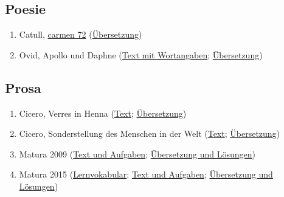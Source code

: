 \documentclass{scrartcl}
\begin{document}
\subsection{Poesie}
\label{sec:org8b35457}
\begin{enumerate}
\item Catull, \href{https://www.dropbox.com/s/kc2coqw11nfxyj1/Catull72.pdf?dl=0}{carmen 72} (\href{http://www.gottwein.de/Lat/catull/catull072.php}{Übersetzung})
\item Ovid, Apollo und Daphne (\href{https://www.dropbox.com/s/g60dha8uuh5h0po/OVIDApolloDaphne.pdf?dl=0}{Text mit Wortangaben}; \href{https://www.dropbox.com/s/366v4v48njyzebm/\%25C3\%259CApollDaphne.pdf?dl=0}{Übersetzung})
\end{enumerate}

\subsection{Prosa}
\label{sec:org68e94b7}
\begin{enumerate}
\item Cicero, Verres in Henna (\href{https://www.dropbox.com/s/gqrgxo7yjxglmdv/Matura\_LatInt\_schriftlich\_2016.pdf?dl=0}{Text}; \href{https://www.dropbox.com/s/h6y42hky2w0o2x9/\%25C3\%259Cbersetzung.pdf?dl=0}{Übersetzung})
\item Cicero, Sonderstellung des Menschen in der Welt (\href{https://www.dropbox.com/s/22oxzqeor9vqb67/LatIntSchriftlMatura2009.pdf?dl=0}{Text}; \href{https://www.dropbox.com/s/ieihesw9h0rkejd/\%25C3\%259CbersetzungMaturaLatIntensiv2009.pdf?dl=0}{Übersetzung})
\item Matura 2009 (\href{https://www.dropbox.com/s/fnt9bzwl6hklwv6/SPFSchriftlich2009.pdf?dl=0}{Text und Aufgaben}; \href{https://www.dropbox.com/s/hh89pcj1sy28kby/KorrekturSchriftlMaturaSPF2009.pdf?dl=0}{Übersetzung und Lösungen})
\item Matura 2015 (\href{https://www.dropbox.com/s/hl878959yooat32/Voki.pdf?dl=0}{Lernvokabular}; \href{https://www.dropbox.com/s/8qaeceb1qyemfwz/KSS\_Matura2015\_final.pdf?dl=0}{Text und Aufgaben}; \href{https://www.dropbox.com/s/xwvzrif0nu15j8h/Korrketur\_SPF\_Latein\_2015.pdf?dl=0}{Übersetzung und
Lösungen})
\end{enumerate}
\end{document}
